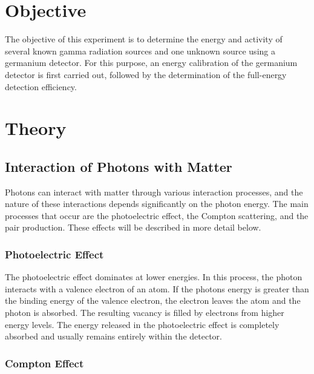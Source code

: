\section{Objective}
\label{sec:Zielsetzung}

The objective of this experiment is to determine the energy and activity of several known gamma radiation sources and one unknown source using a germanium detector. For this purpose, an energy calibration of the germanium detector is first carried out, followed by the determination of the full-energy detection efficiency.

\section{Theory}
\label{sec:Theorie}


\subsection{Interaction of Photons with Matter}
\label{sec:process}

\noindent
Photons can interact with matter through various interaction processes, and the nature of these interactions depends significantly on the photon energy. The main processes that occur are the photoelectric effect, the Compton scattering, and the pair production. These effects will be described in more detail below.

\subsubsection*{Photoelectric Effect}
The photoelectric effect dominates at lower energies. In this process, the photon interacts with a valence electron of an atom. If the photons energy is greater than the binding energy of the valence electron, the electron leaves the atom and the photon is absorbed. The resulting vacancy is filled by electrons from higher energy levels.  
The energy released in the photoelectric effect is completely absorbed and usually remains entirely within the detector.

\subsubsection*{Compton Effect}


